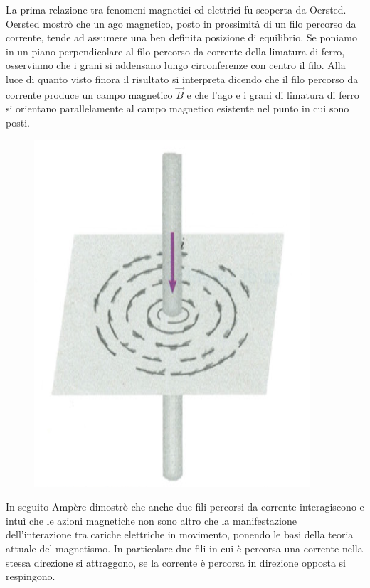 \documentclass[class=book, crop=false, oneside, 12pt]{standalone}
\begin{document}
La prima relazione tra fenomeni magnetici ed elettrici fu scoperta da Oersted.
Oersted mostrò che un ago magnetico, posto in prossimità di un filo percorso da corrente, tende ad assumere una ben definita posizione di equilibrio. 
Se poniamo in un piano perpendicolare al filo percorso da corrente della limatura di ferro, osserviamo che i grani si addensano lungo circonferenze con centro il filo. 
Alla luce di quanto visto finora il risultato si interpreta dicendo che il filo percorso da corrente produce un campo magnetico \(\overrightarrow{B}\) e che l'ago e i grani di limatura di ferro si orientano parallelamente al campo magnetico esistente nel punto in cui sono posti. 
\begin{figure}[h]
    \includegraphics[scale=0.4]{campo_magnetico_filo_corrente.png}
    \centering
    \caption{}
\end{figure}
In seguito Ampère dimostrò che anche due fili percorsi da corrente interagiscono e intuì che le azioni magnetiche non sono altro che la manifestazione dell'interazione tra cariche elettriche in movimento, ponendo le basi della teoria attuale del magnetismo. 
In particolare due fili in cui è percorsa una corrente nella stessa direzione si attraggono, se la corrente è percorsa in direzione opposta si respingono.
\end{document}
